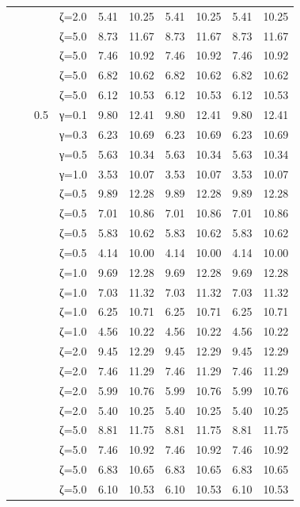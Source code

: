 \begin{table}[htbp]
\begin{tabular}{ll r l  rr  rr  rr}
  &  &  & ζ=2.0 & 5.41 & 10.25 & 5.41 & 10.25 & 5.41 & 10.25 \\
  &  &  & ζ=5.0 & 8.73 & 11.67 & 8.73 & 11.67 & 8.73 & 11.67 \\
  &  &  & ζ=5.0 & 7.46 & 10.92 & 7.46 & 10.92 & 7.46 & 10.92 \\
  &  &  & ζ=5.0 & 6.82 & 10.62 & 6.82 & 10.62 & 6.82 & 10.62 \\
  &  &  & ζ=5.0 & 6.12 & 10.53 & 6.12 & 10.53 & 6.12 & 10.53 \\
  &  & 0.5 & γ=0.1 & 9.80 & 12.41 & 9.80 & 12.41 & 9.80 & 12.41 \\
  &  &  & γ=0.3 & 6.23 & 10.69 & 6.23 & 10.69 & 6.23 & 10.69 \\
  &  &  & γ=0.5 & 5.63 & 10.34 & 5.63 & 10.34 & 5.63 & 10.34 \\
  &  &  & γ=1.0 & 3.53 & 10.07 & 3.53 & 10.07 & 3.53 & 10.07 \\
  &  &  & ζ=0.5 & 9.89 & 12.28 & 9.89 & 12.28 & 9.89 & 12.28 \\
  &  &  & ζ=0.5 & 7.01 & 10.86 & 7.01 & 10.86 & 7.01 & 10.86 \\
  &  &  & ζ=0.5 & 5.83 & 10.62 & 5.83 & 10.62 & 5.83 & 10.62 \\
  &  &  & ζ=0.5 & 4.14 & 10.00 & 4.14 & 10.00 & 4.14 & 10.00 \\
  &  &  & ζ=1.0 & 9.69 & 12.28 & 9.69 & 12.28 & 9.69 & 12.28 \\
  &  &  & ζ=1.0 & 7.03 & 11.32 & 7.03 & 11.32 & 7.03 & 11.32 \\
  &  &  & ζ=1.0 & 6.25 & 10.71 & 6.25 & 10.71 & 6.25 & 10.71 \\
  &  &  & ζ=1.0 & 4.56 & 10.22 & 4.56 & 10.22 & 4.56 & 10.22 \\
  &  &  & ζ=2.0 & 9.45 & 12.29 & 9.45 & 12.29 & 9.45 & 12.29 \\
  &  &  & ζ=2.0 & 7.46 & 11.29 & 7.46 & 11.29 & 7.46 & 11.29 \\
  &  &  & ζ=2.0 & 5.99 & 10.76 & 5.99 & 10.76 & 5.99 & 10.76 \\
  &  &  & ζ=2.0 & 5.40 & 10.25 & 5.40 & 10.25 & 5.40 & 10.25 \\
  &  &  & ζ=5.0 & 8.81 & 11.75 & 8.81 & 11.75 & 8.81 & 11.75 \\
  &  &  & ζ=5.0 & 7.46 & 10.92 & 7.46 & 10.92 & 7.46 & 10.92 \\
  &  &  & ζ=5.0 & 6.83 & 10.65 & 6.83 & 10.65 & 6.83 & 10.65 \\
  &  &  & ζ=5.0 & 6.10 & 10.53 & 6.10 & 10.53 & 6.10 & 10.53 \\

\end{tabular}
\end{table}
